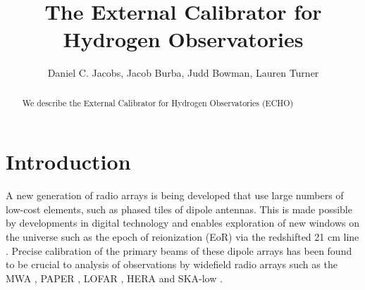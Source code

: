 \documentclass[preprint2,numberedappendix,tighten,twocolappendix]{aastex6}
\begin{document}
\title{The External Calibrator for Hydrogen Observatories}



\author{
Daniel C. Jacobs,
Jacob Burba,
Judd Bowman,
Lauren Turner
}




\begin{abstract}
We describe the External Calibrator for Hydrogen Observatories (ECHO)
\end{abstract}




\section{Introduction}\label{sec:intro}

A new generation of radio arrays is being developed that use large numbers of low-cost elements, such as phased tiles of dipole antennas. This is made possible by developments in digital technology and enables exploration of new windows on the universe such as the epoch of reionization (EoR) via the redshifted 21 cm line \citep{Morales:2010p8093,Furlanetto:2006p2267,Madau:1997p2232}. Precise calibration of the primary beams of these dipole arrays has been found to be crucial to analysis of observations by widefield radio arrays such as the MWA \citep{Tingay:2013p9022,Bowman:2013p9950}, PAPER \citep{Pober:2012p8800,2015ApJ...809...61A,2013ApJ...776..108J}, LOFAR \cite{Yatawatta:2013p9699}, HERA \citep{2016:deBoerHERAarxiv} and SKA-low \citep{Mellema:2013p10035,Mort:2016SKAlowimagingarxiv}.
\end{document}

